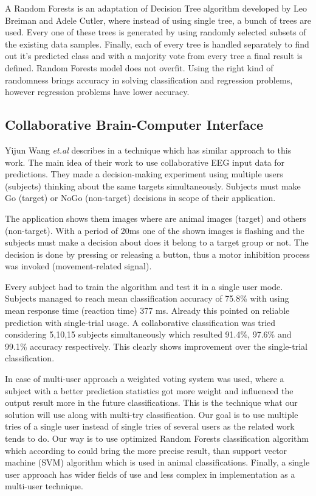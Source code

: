 \documentclass[12pt]{article}
\begin{document}
A Random Forests is an adaptation of Decision Tree algorithm developed by Leo Breiman and Adele Cutler, where instead of using single tree, a bunch of trees are used. Every one of these trees is generated by using randomly selected subsets of the existing data samples. Finally, each of every tree is handled separately to find out it's predicted class and with a majority vote from every tree a final result is defined. Random Forests model does not overfit. Using the right kind of randomness brings accuracy in solving classification and regression problems, however regression problems have lower accuracy.\cite{breiman_rf}

\subsection{Collaborative Brain-Computer Interface}

Yijun Wang {\it et.al} describes in \cite{collaborative_wang} a technique which has similar approach to this work. The main idea of their work to use collaborative EEG input data for predictions. They made a decision-making experiment using multiple users (subjects) thinking about the same targets simultaneously. Subjects must make Go (target) or NoGo (non-target) decisions in scope of their application. 

The application shows them images where are animal images (target) and others (non-target). With a period of 20ms one of the shown images is flashing and the subjects must make a decision about does it belong to a target group or not. The decision is done by pressing or releasing a button, thus a motor inhibition process was invoked (movement-related signal). 

Every subject had to train the algorithm and test it in a single user mode. Subjects managed to reach mean classification accuracy of 75.8\% with using mean response time (reaction time) 377 ms. Already this pointed on reliable prediction with single-trial usage. A collaborative classification was tried considering 5,10,15 subjects simultaneously which resulted 91.4\%, 97.6\% and 99.1\% accuracy respectively. This clearly shows improvement over the single-trial classification. 

In case of multi-user approach a weighted voting system was used, where a subject with a better prediction statistics got more weight and influenced the output result more in the future classifications. This is the technique what our solution will use along with multi-try classification. Our goal is to use multiple tries of a single user instead of single tries of several users as the related work tends to do. Our way is to use optimized Random Forests classification algorithm which according to \cite{masso} could bring the more precise result, than support vector machine (SVM) algorithm which is used in animal classifications. Finally, a single user approach has wider fields of use and less complex in implementation as a multi-user technique.
\end{document}
